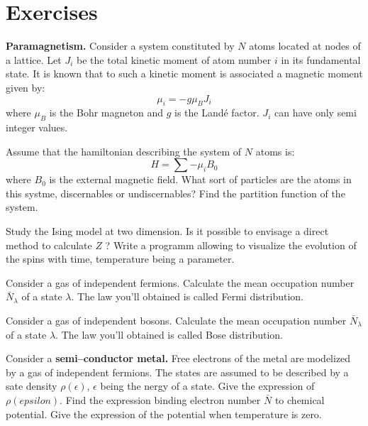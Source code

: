 \documentclass[12pt]{book}
\begin{document}
\section{Exercises}
\begin{exo}
{\bf Paramagnetism.} Consider a system constituted by $N$ atoms located at
nodes of a lattice. Let $J_i$ be the total kinetic moment of atom number $i$
in its fundamental state. It is known that to such a kinetic moment is
associated a magnetic moment given by:
\begin{equation}
\mu_i=-g\mu_BJ_i
\end{equation}
where $\mu_B$ is the Bohr magneton and $g$ is the Land\'e factor.  $J_i$ can
have only semi integer values.

Assume that the hamiltonian describing the system of $N$ atoms is:
\begin{equation}
H=\sum -\mu_i B_0
\end{equation}
where $B_0$ is the external magnetic field. What sort of particles are the
atoms in this systme, discernables or undiscernables? Find the partition
function of the system.
\end{exo}

\begin{exo}
Study the Ising model at two dimension. Is it possible to envisage a direct
method to calculate $Z$ ? Write a programm allowing to visualize the evolution
of the spins with time, temperature being a parameter.
\end{exo}

\begin{exo}
Consider a gas of independent fermions. Calculate the mean occupation number
$\bar N_\lambda$ of a state $\lambda$. The law you'll obtained is called Fermi
distribution.
\end{exo}

\begin{exo}
Consider a gas of independent bosons. Calculate the mean occupation number
$\bar N_\lambda$ of a state $\lambda$. The law you'll obtained is called Bose
distribution.
\end{exo}

\begin{exo}
Consider a {\bf semi--conductor metal.} Free electrons of the metal are
modelized by a gas of independent fermions. The states are assumed to be
described by a sate density $\rho(\epsilon)$,
$\epsilon$ being the nergy of a state. Give the expression of $\rho(epsilon)$.
Find the expression binding electron number $\bar N$ to chemical
potential. Give the expression of the potential when temperature is zero.
\end{exo}
\end{document}
